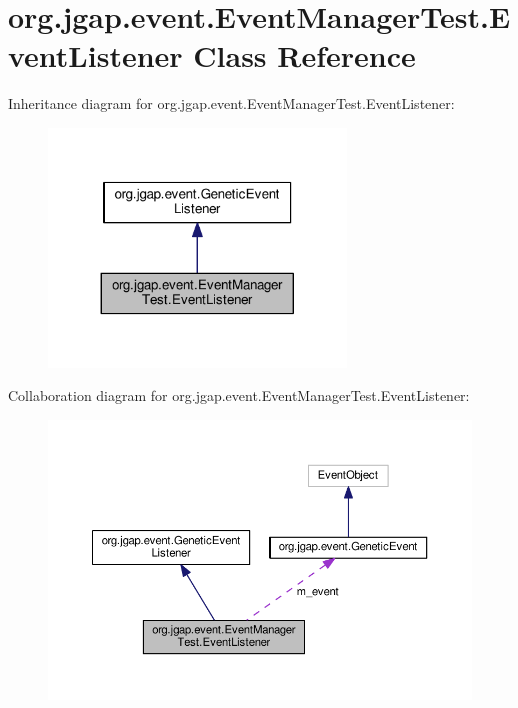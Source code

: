 \hypertarget{classorg_1_1jgap_1_1event_1_1_event_manager_test_1_1_event_listener}{\section{org.\-jgap.\-event.\-Event\-Manager\-Test.\-Event\-Listener Class Reference}
\label{classorg_1_1jgap_1_1event_1_1_event_manager_test_1_1_event_listener}
}


Inheritance diagram for org.\-jgap.\-event.\-Event\-Manager\-Test.\-Event\-Listener\-:
\nopagebreak
\begin{figure}[H]
\begin{center}
\leavevmode
\includegraphics[width=224pt]{classorg_1_1jgap_1_1event_1_1_event_manager_test_1_1_event_listener__inherit__graph}
\end{center}
\end{figure}


Collaboration diagram for org.\-jgap.\-event.\-Event\-Manager\-Test.\-Event\-Listener\-:
\nopagebreak
\begin{figure}[H]
\begin{center}
\leavevmode
\includegraphics[width=350pt]{classorg_1_1jgap_1_1event_1_1_event_manager_test_1_1_event_listener__coll__graph}
\end{center}
\end{figure}
